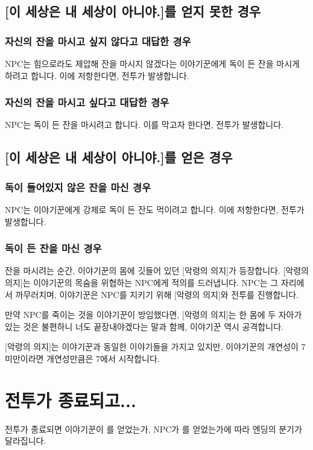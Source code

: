 \documentclass{report}
\begin{document}
	\subsection{[이 세상은 내 세상이 아니야.]를 얻지 못한 경우}
		\subsubsection{자신의 잔을 마시고 싶지 않다고 대답한 경우}
			NPC는 힘으로라도 제압해 잔을 마시지 않겠다는 이야기꾼에게 독이 든 잔을 마시게 하려고 합니다. 이에 저항한다면, 전투가 발생합니다.
			
		\subsubsection{자신의 잔을 마시고 싶다고 대답한 경우}
			NPC는 독이 든 잔을 마시려고 합니다. 이를 막고자 한다면, 전투가 발생합니다.
	
	\subsection{[이 세상은 내 세상이 아니야.]를 얻은 경우}
		\subsubsection{독이 들어있지 않은 잔을 마신 경우}
			NPC는 이야기꾼에게 강제로 독이 든 잔도 먹이려고 합니다. 이에 저항한다면, 전투가 발생합니다.
		
		\subsubsection{독이 든 잔을 마신 경우}
			잔을 마시려는 순간, 이야기꾼의 몸에 깃들어 있던 [악령의 의지]가 등장합니다. [악령의 의지]는 이야기꾼의 목숨을 위협하는 NPC에게 적의를 드러냅니다. NPC는 그 자리에서 까무러치며, 이야기꾼은 NPC를 지키기 위해 [악령의 의지]와 전투를 진행합니다.
			
			만약 NPC를 죽이는 것을 이야기꾼이 방임했다면, [악령의 의지]는 한 몸에 두 자아가 있는 것은 불편하니 너도 끝장내야겠다는 말과 함께, 이야기꾼 역시 공격합니다.
			
			[악령의 의지]는 이야기꾼과 동일한 이야기들을 가지고 있지만, 이야기꾼의 개연성이 7 미만이라면 개연성만큼은 7에서 시작합니다.
	
	\section{전투가 종료되고...}
	전투가 종료되면 이야기꾼이 를 얻었는가, NPC가 를 얻었는가에 따라 엔딩의 분기가 달라집니다.
	
\end{document}
